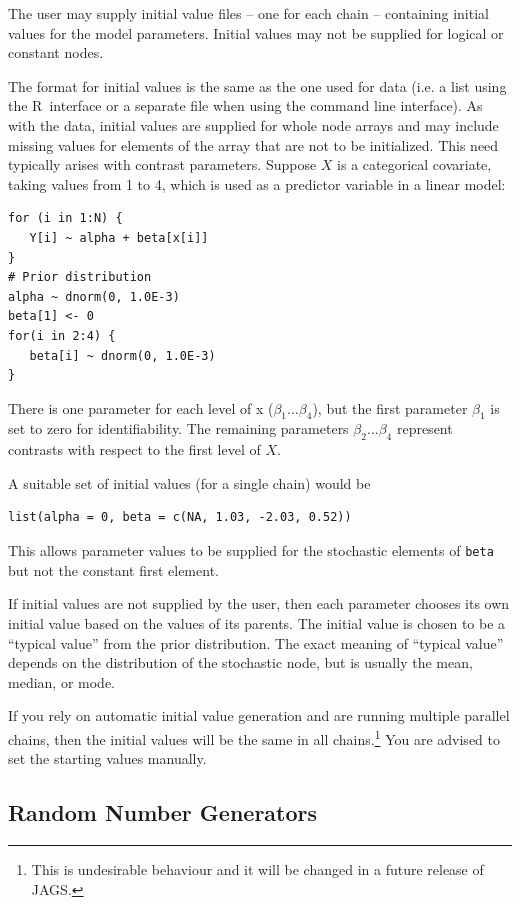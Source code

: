 \documentclass[11pt, a4paper, titlepage]{report}
\newcommand{\JAGS}{\textsf{JAGS}}
\newcommand{\R}{\textsf{R}}
\begin{document}
The user may supply initial value files -- one for each chain --
containing initial values for the model parameters. Initial values may
not be supplied for logical or constant nodes.

The format for initial values is the same as the one used for data
(i.e. a list using the \R\ interface or a separate file when using the
command line interface). As with the data, initial values are supplied
for whole node arrays and may include missing values for elements of
the array that are not to be initialized.  This need typically arises
with contrast parameters.  Suppose $X$ is a categorical covariate,
taking values from 1 to 4, which is used as a predictor variable in a
linear model:
\begin{verbatim}
for (i in 1:N) {
   Y[i] ~ alpha + beta[x[i]]
}
# Prior distribution
alpha ~ dnorm(0, 1.0E-3)
beta[1] <- 0
for(i in 2:4) {
   beta[i] ~ dnorm(0, 1.0E-3)
}
\end{verbatim}
There is one parameter for each level of x ($\beta_1 \ldots \beta_4$),
but the first parameter $\beta_1$ is set to zero for
identifiability. The remaining parameters $\beta_2 \ldots \beta_4$
represent contrasts with respect to the first level of $X$.

A suitable set of initial values (for a single chain) would be
\begin{verbatim}
list(alpha = 0, beta = c(NA, 1.03, -2.03, 0.52))
\end{verbatim}
This allows parameter values to be supplied for the stochastic
elements of \verb+beta+ but not the constant first element.

If initial values are not supplied by the user, then each parameter
chooses its own initial value based on the values of its parents.  The
initial value is chosen to be a ``typical value'' from the prior
distribution. The exact meaning of ``typical value'' depends on the
distribution of the stochastic node, but is usually the mean, median,
or mode.

If you rely on automatic initial value generation and are running
multiple parallel chains, then the initial values will be the same in
all chains.\footnote{This is undesirable behaviour and it will be changed in a
future release of \JAGS.} You are advised to set the starting values
manually.

\subsection{Random Number Generators}
\label{section:rngs}
\end{document}
